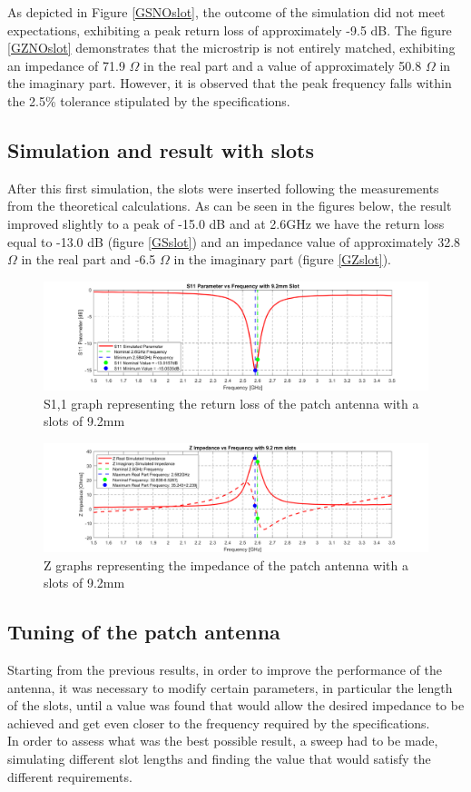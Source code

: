 \documentclass[]{article}
\begin{document}
As depicted in Figure \eqref{GSNOslot}, the outcome of the simulation did not meet expectations, exhibiting a peak return loss of approximately -9.5 dB. The figure \eqref{GZNOslot} demonstrates that the microstrip is not entirely matched, exhibiting an impedance of 71.9 $\Omega$ in the real part and a value of approximately 50.8 $\Omega$ in the imaginary part. However, it is observed that the peak frequency falls within the 2.5\% tolerance stipulated by the specifications.
\subsection{Simulation and result with slots}
After this first simulation, the slots were inserted following the measurements from the theoretical calculations. As can be seen in the figures below, the result improved slightly to a peak of -15.0 dB and at 2.6GHz we have the return loss equal to -13.0 dB (figure \eqref{GSslot}) and an impedance value of approximately 32.8 $\Omega$ in the real part and -6.5 $\Omega$  in the imaginary part (figure \eqref{GZslot}).
 \begin{figure}[H]
	\centering
	\includegraphics[width=0.85\linewidth]{img/img5}
	\caption{S1,1 graph representing the return loss of the patch antenna with a slots of 9.2mm}
	\label{GSslot}
\end{figure}

\begin{figure}[H]
	\centering
	\includegraphics[width=0.85\linewidth]{img/img6}
	\caption{Z graphs representing the impedance of the patch antenna with a slots of 9.2mm}
	\label{GZslot}
\end{figure}
\newpage
 \subsection{Tuning of the patch antenna}
 Starting from the previous results, in order to improve the performance of the antenna, it was necessary to modify certain parameters, in particular the length of the slots, until a value was found that would allow the desired impedance to be achieved and get even closer to the frequency required by the specifications.\\
  In order to assess what was the best possible result, a sweep had to be made, simulating different slot lengths and finding the value that would satisfy the different requirements.\\
  
\end{document}
